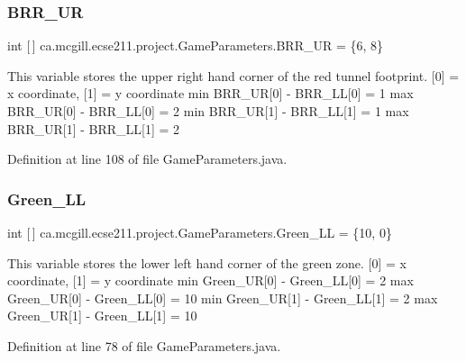 \subsubsection{\texorpdfstring{B\+R\+R\+\_\+\+UR}{BRR\_UR}}
{\footnotesize\ttfamily int \mbox{[}$\,$\mbox{]} ca.\+mcgill.\+ecse211.\+project.\+Game\+Parameters.\+B\+R\+R\+\_\+\+UR = \{6, 8\}\hspace{0.3cm}{\ttfamily [static]}}

This variable stores the upper right hand corner of the red tunnel footprint. \mbox{[}0\mbox{]} = x coordinate, \mbox{[}1\mbox{]} = y coordinate min B\+R\+R\+\_\+\+UR\mbox{[}0\mbox{]} -\/ B\+R\+R\+\_\+\+LL\mbox{[}0\mbox{]} = 1 max B\+R\+R\+\_\+\+UR\mbox{[}0\mbox{]} -\/ B\+R\+R\+\_\+\+LL\mbox{[}0\mbox{]} = 2 min B\+R\+R\+\_\+\+UR\mbox{[}1\mbox{]} -\/ B\+R\+R\+\_\+\+LL\mbox{[}1\mbox{]} = 1 max B\+R\+R\+\_\+\+UR\mbox{[}1\mbox{]} -\/ B\+R\+R\+\_\+\+LL\mbox{[}1\mbox{]} = 2 

Definition at line 108 of file Game\+Parameters.\+java.

\mbox{\label{classca_1_1mcgill_1_1ecse211_1_1project_1_1_game_parameters_a24e38b735e194403bf2b9877241969c1}} 
\subsubsection{\texorpdfstring{Green\+\_\+\+LL}{Green\_LL}}
{\footnotesize\ttfamily int \mbox{[}$\,$\mbox{]} ca.\+mcgill.\+ecse211.\+project.\+Game\+Parameters.\+Green\+\_\+\+LL = \{10, 0\}\hspace{0.3cm}{\ttfamily [static]}}

This variable stores the lower left hand corner of the green zone. \mbox{[}0\mbox{]} = x coordinate, \mbox{[}1\mbox{]} = y coordinate min Green\+\_\+\+UR\mbox{[}0\mbox{]} -\/ Green\+\_\+\+LL\mbox{[}0\mbox{]} = 2 max Green\+\_\+\+UR\mbox{[}0\mbox{]} -\/ Green\+\_\+\+LL\mbox{[}0\mbox{]} = 10 min Green\+\_\+\+UR\mbox{[}1\mbox{]} -\/ Green\+\_\+\+LL\mbox{[}1\mbox{]} = 2 max Green\+\_\+\+UR\mbox{[}1\mbox{]} -\/ Green\+\_\+\+LL\mbox{[}1\mbox{]} = 10 

Definition at line 78 of file Game\+Parameters.\+java.

